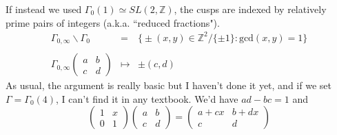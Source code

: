 \documentclass[12pt]{article}
\begin{document}
If instead we used $\Gamma_0(1) \simeq SL(2, \mathbb{Z})$, the cusps are indexed by relatively prime pairs of integers (a.k.a. ``reduced fractions").
\begin{eqnarray*}
\Gamma_{0,\infty} \backslash \Gamma_0 &=& \big\{ \pm (x,y) \in \mathbb{Z}^2 / \{\pm 1\} : \text{gcd}(x,y) = 1  \big\}  \\ \\
\Gamma_{0, \infty}    \left( \begin{array}{cc} a & b \\ c & d\end{array} \right)    &\mapsto& \pm(c,d)
\end{eqnarray*}
As usual, the argument is really basic but I haven't done it yet, and if we set $\Gamma = \Gamma_0(4)$,  I can't find it in any textbook.  We'd have $ad-bc = 1$ and 
$$  \left(\begin{array}{cc} 1 & x \\ 0 & 1\end{array} \right)\left( \begin{array}{cc} a & b \\ c & d\end{array} \right)  = \left(\begin{array}{cc} a+cx & b+dx \\ c & d\end{array} \right) $$

\newpage
\end{document}
